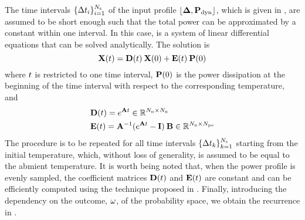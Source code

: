 The time intervals $\{ \Delta t_i \}_{i = 1}^{N_\text{s}}$ of the input profile $\profPdyn$, which is given in , are assumed to be short enough such that the total power can be approximated by a constant within one interval. In this case,  is a system of linear differential equations that can be solved analytically. The solution is \cite{ukhov2012}
\begin{equation} \elabel{ode-solution}
  \vX(\t) = \mCF(\t) \: \vX(0) + \mCS(\t) \: \vP(0)
\end{equation}
where $t$ is restricted to one time interval, $\mathbf{P}(0)$ is the power dissipation at the beginning of the time interval with respect to the corresponding temperature, and
\begin{align*}
  & \mCF(\t) = e^{\mA \t} \in \real^{\nodes \times \nodes} \\
  & \mCS(\t) = \mA^{-1} (e^{\mA \t} - \mI) \: \mB \in \real^{\nodes \times \cores}
\end{align*}
The procedure is to be repeated for all time intervals $\{ \Delta t_k \}_{k=1}^{N_\text{s}}$ starting from the initial temperature, which, without loss of generality, is assumed to be equal to the abmient temperature. It is worth being noted that, when the power profile is evenly sampled, the coefficient matrices $\mCF(\t)$ and $\mCS(\t)$ are constant and can be efficiently computed using the technique proposed in \cite{ukhov2012}.  Finally, introducing the dependency on the outcome, $\omega$, of the probability space, we obtain the recurrence in .
